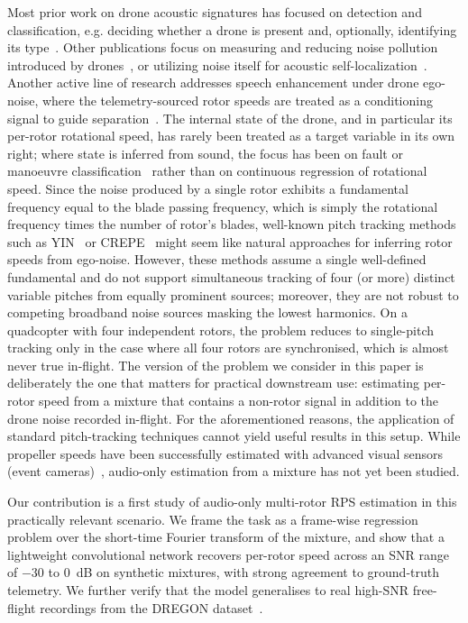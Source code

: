 \documentclass{QD_2026}
\begin{document}
Most prior work on drone acoustic signatures has focused on detection and classification, e.g. deciding whether a drone is present and, optionally, identifying its type~. Other publications focus on measuring and reducing noise pollution introduced by drones~, or utilizing noise itself for acoustic self-localization~. Another active line of research addresses speech enhancement under drone ego-noise, where the telemetry-sourced rotor speeds are treated as a conditioning signal to guide separation~. The internal state of the drone, and in particular its per-rotor rotational speed, has rarely been treated as a target variable in its own right; where state is inferred from sound, the focus has been on fault or manoeuvre classification~ rather than on continuous regression of rotational speed. Since the noise produced by a single rotor exhibits a fundamental frequency equal to the blade passing frequency, which is simply the rotational frequency times the number of rotor's blades, well-known pitch tracking methods such as YIN~ or CREPE~ might seem like natural approaches for inferring rotor speeds from ego-noise. However, these methods assume a single well-defined fundamental and do not support simultaneous tracking of four (or more) distinct variable pitches from equally prominent sources; moreover, they are not robust to competing broadband noise sources masking the lowest harmonics. On a quadcopter with four independent rotors, the problem reduces to single-pitch tracking only in the case where all four rotors are synchronised, which is almost never true in-flight. The version of the problem we consider in this paper is deliberately the one that matters for practical downstream use: estimating per-rotor speed from a mixture that contains a non-rotor signal in addition to the drone noise recorded in-flight. For the aforementioned reasons, the application of standard pitch-tracking techniques cannot yield useful results in this setup. While propeller speeds have been successfully estimated with advanced visual sensors (event cameras)~, audio-only estimation from a mixture has not yet been studied. 

Our contribution is a first study of audio-only multi-rotor RPS estimation in this practically relevant scenario. We frame the task as a frame-wise regression problem over the short-time Fourier transform of the mixture, and show that a lightweight convolutional network recovers per-rotor speed across an SNR range of $-30$ to $0$~dB on synthetic mixtures,
with strong agreement to ground-truth telemetry. We further verify that the model generalises to real high-SNR free-flight recordings from the DREGON dataset~. 
\end{document}
